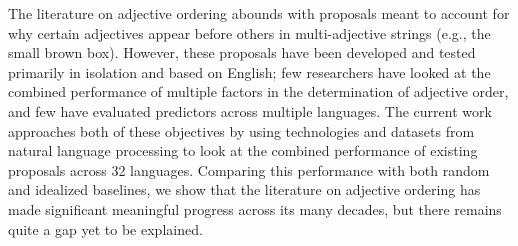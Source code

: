The literature on adjective ordering abounds with proposals meant to account for why certain adjectives appear before others in multi-adjective strings (e.g., the small brown box). However, these proposals have been developed and tested primarily in isolation and based on English; few researchers have looked at the combined performance of multiple factors in the determination of adjective order, and few have evaluated predictors across multiple languages. The current work approaches both of these objectives by using technologies and datasets from natural language processing to look at the combined performance of existing proposals across 32 languages. Comparing this performance with both random and idealized baselines, we show that the literature on adjective ordering has made significant meaningful progress across its many decades, but there remains quite a gap yet to be explained.